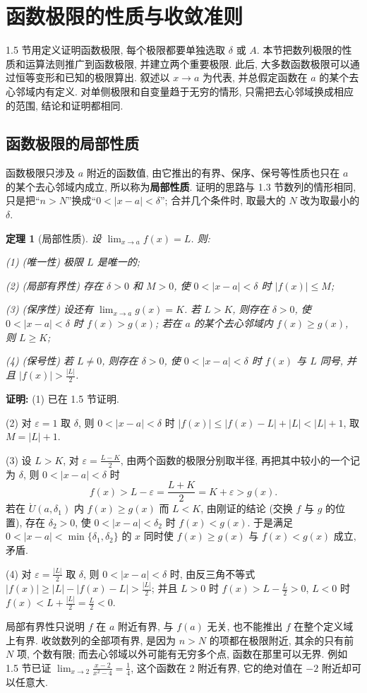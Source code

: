 \documentclass[UTF8,openany]{ctexbook}
\theoremstyle{chinesetextbook}
\newtheorem{theorem}{定理}[section]
\newenvironment{cnproof}{\par\indent\textbf{证明:} \ignorespaces}{\par}
\begin{document}
\section{函数极限的性质与收敛准则}
1.5 节用定义证明函数极限, 每个极限都要单独选取 $\delta$ 或 $A$. 本节把数列极限的性质和运算法则推广到函数极限, 并建立两个重要极限. 此后, 大多数函数极限可以通过恒等变形和已知的极限算出. 叙述以 $x\to a$ 为代表, 并总假定函数在 $a$ 的某个去心邻域内有定义. 对单侧极限和自变量趋于无穷的情形, 只需把去心邻域换成相应的范围, 结论和证明都相同.
\subsection{函数极限的局部性质}
函数极限只涉及 $a$ 附近的函数值, 由它推出的有界、保序、保号等性质也只在 $a$ 的某个去心邻域内成立, 所以称为\textbf{局部性质}. 证明的思路与 1.3 节数列的情形相同, 只是把“$n>N$”换成“$0<|x-a|<\delta$”; 合并几个条件时, 取最大的 $N$ 改为取最小的 $\delta$.
\begin{theorem}[局部性质]
设 $\displaystyle\lim_{x\to a}f(x)=L$. 则:

\textup{(1)} (唯一性) 极限 $L$ 是唯一的;

\textup{(2)} (局部有界性) 存在 $\delta>0$ 和 $M>0$, 使 $0<|x-a|<\delta$ 时 $|f(x)|\le M$;

\textup{(3)} (保序性) 设还有 $\displaystyle\lim_{x\to a}g(x)=K$. 若 $L>K$, 则存在 $\delta>0$, 使 $0<|x-a|<\delta$ 时 $f(x)>g(x)$; 若在 $a$ 的某个去心邻域内 $f(x)\ge g(x)$, 则 $L\ge K$;

\textup{(4)} (保号性) 若 $L\ne0$, 则存在 $\delta>0$, 使 $0<|x-a|<\delta$ 时 $f(x)$ 与 $L$ 同号, 并且 $\displaystyle|f(x)|>\frac{|L|}2$.
\end{theorem}
\begin{cnproof}
(1) 已在 1.5 节证明.

(2) 对 $\varepsilon=1$ 取 $\delta$, 则 $0<|x-a|<\delta$ 时 $|f(x)|\le|f(x)-L|+|L|<|L|+1$, 取 $M=|L|+1$.

(3) 设 $L>K$, 对 $\displaystyle\varepsilon=\frac{L-K}2$, 由两个函数的极限分别取半径, 再把其中较小的一个记为 $\delta$, 则 $0<|x-a|<\delta$ 时
\[
f(x)>L-\varepsilon=\frac{L+K}2=K+\varepsilon>g(x).
\]
若在 $\mathring U(a,\delta_1)$ 内 $f(x)\ge g(x)$ 而 $L<K$, 由刚证的结论 (交换 $f$ 与 $g$ 的位置), 存在 $\delta_2>0$, 使 $0<|x-a|<\delta_2$ 时 $f(x)<g(x)$. 于是满足 $0<|x-a|<\min\{\delta_1,\delta_2\}$ 的 $x$ 同时使 $f(x)\ge g(x)$ 与 $f(x)<g(x)$ 成立, 矛盾.

(4) 对 $\displaystyle\varepsilon=\frac{|L|}2$ 取 $\delta$, 则 $0<|x-a|<\delta$ 时, 由反三角不等式 $\displaystyle|f(x)|\ge|L|-|f(x)-L|>\frac{|L|}2$; 并且 $L>0$ 时 $\displaystyle f(x)>L-\frac L2>0$, $L<0$ 时 $\displaystyle f(x)<L+\frac{|L|}2=\frac L2<0$.
\end{cnproof}
局部有界性只说明 $f$ 在 $a$ 附近有界, 与 $f(a)$ 无关, 也不能推出 $f$ 在整个定义域上有界. 收敛数列的全部项有界, 是因为 $n>N$ 的项都在极限附近, 其余的只有前 $N$ 项, 个数有限; 而去心邻域以外可能有无穷多个点, 函数在那里可以无界. 例如 1.5 节已证 $\displaystyle\lim_{x\to2}\frac{x-2}{x^2-4}=\frac14$, 这个函数在 $2$ 附近有界, 它的绝对值在 $-2$ 附近却可以任意大.
\end{document}
